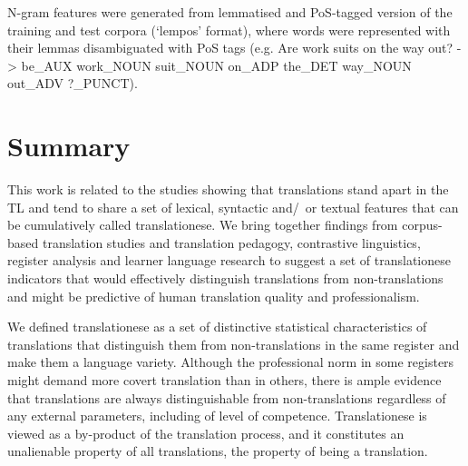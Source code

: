 




N-gram features were generated from lemmatised and PoS-tagged version of the training and test corpora  (`lempos' format), where words were represented with their lemmas disambiguated with PoS tags (e.g. Are work suits on the way out? -> be\_AUX work\_NOUN suit\_NOUN on\_ADP the\_DET way\_NOUN out\_ADV ?\_PUNCT).

\section{\label{sec:sum2}Summary}
This work is related to the studies showing that translations stand apart in the TL and tend to share a set of lexical, syntactic and/~or textual features that can be cumulatively called translationese. We bring together findings from corpus-based translation studies and translation pedagogy, contrastive linguistics, register analysis and learner language research to suggest a set of translationese indicators that would effectively distinguish translations from non-translations and might be predictive of human translation quality and professionalism. 

We defined translationese as a set of distinctive statistical characteristics of translations that distinguish them from non-translations in the same register and make them a language variety. Although the professional norm in some registers might demand more covert translation than in others, there is ample evidence that translations are always distinguishable from non-translations regardless of any external parameters, including of level of competence. Translationese is viewed as a by-product of the translation process, and it constitutes an unalienable property of all translations, the property of being a translation.  

